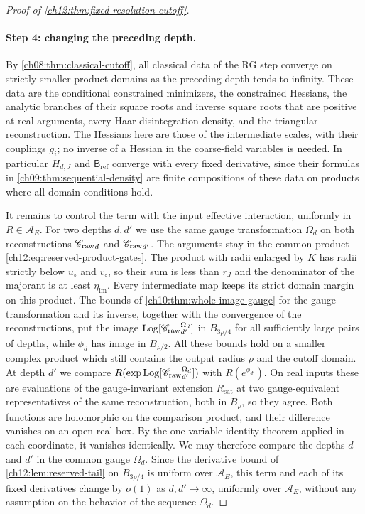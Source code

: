 \begin{proof}[Proof of \cref{ch12:thm:fixed-resolution-cutoff}]
\paragraph{Step 4: changing the preceding depth.}
By \cref{ch08:thm:classical-cutoff}, all classical data of the RG step converge on strictly smaller product domains as the preceding depth tends to infinity. These data are the conditional constrained minimizers, the constrained Hessians, the analytic branches of their square roots and inverse square roots that are positive at real arguments, every Haar disintegration density, and the triangular reconstruction. The Hessians here are those of the intermediate scales, with their couplings $g_i$; no inverse of a Hessian in the coarse-field variables is needed. In particular $H_{d,J}$ and $\mathsf B_{\mathrm{ref}}$ converge with every fixed derivative, since their formulas in \cref{ch09:thm:sequential-density} are finite compositions of these data on products where all domain conditions hold.

It remains to control the term with the input effective interaction, uniformly in $R\in\mathcal A_E$. For two depths $d,d'$ we use the same gauge transformation $\Omega_d$ on both reconstructions ${\mathscr C_{\mathrm{raw}}}_d$ and ${\mathscr C_{\mathrm{raw}}}_{d'}$. The arguments stay in the common product \eqref{ch12:eq:reserved-product-gates}. The product with radii enlarged by $K$ has radii strictly below $u_\circ$ and $v_\circ$, so their sum is less than $r_J$ and the denominator of the majorant is at least $\eta_{\mathrm{im}}$. Every intermediate map keeps its strict domain margin on this product. The bounds of \cref{ch10:thm:whole-image-gauge} for the gauge transformation and its inverse, together with the convergence of the reconstructions, put the image $\operatorname{Log}[{\mathscr C_{\mathrm{raw}}}_{d'}^{\Omega_d}]$ in $B_{3\rho/4}$ for all sufficiently large pairs of depths, while $\phi_d$ has image in $B_{\rho/2}$. All these bounds hold on a smaller complex product which still contains the output radius $\rho$ and the cutoff domain. At depth $d'$ we compare $R(\exp\operatorname{Log}[{\mathscr C_{\mathrm{raw}}}_{d'}^{\Omega_d}])$ with $R(e^{\phi_{d'}})$. On real inputs these are evaluations of the gauge-invariant extension $R_{\mathrm{sat}}$ at two gauge-equivalent representatives of the same reconstruction, both in $B_\rho$, so they agree. Both functions are holomorphic on the comparison product, and their difference vanishes on an open real box. By the one-variable identity theorem applied in each coordinate, it vanishes identically. We may therefore compare the depths $d$ and $d'$ in the common gauge $\Omega_d$. Since the derivative bound of \cref{ch12:lem:reserved-tail} on $B_{3\rho/4}$ is uniform over $\mathcal A_E$, this term and each of its fixed derivatives change by $o(1)$ as $d,d'\to\infty$, uniformly over $\mathcal A_E$, without any assumption on the behavior of the sequence $\Omega_d$.


\end{proof}
